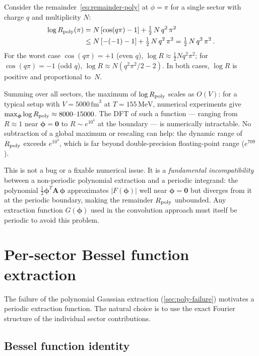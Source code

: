 \documentclass[11pt,a4paper]{article}
\newcommand{\fm}{\,\text{fm}}
\newcommand{\MeV}{\,\text{MeV}}
\newcommand{\bphi}{\bm{\phi}}
\newcommand{\bA}{\bm{A}}
\begin{document}
Consider the remainder~\cref{eq:remainder-poly} at $\phi = \pi$ for a single sector with charge $q$ and multiplicity $N$:
\begin{align}\label{eq:remainder-bound}
  \log R_{\rm poly}(\pi) &= N\,[\cos(q\pi) - 1] + \tfrac{1}{2}\,N\,q^2\,\pi^2 \nonumber\\
  &\leq N\,[-(-1) - 1] + \tfrac{1}{2}\,N\,q^2\,\pi^2 = \tfrac{1}{2}\,N\,q^2\,\pi^2\,.
\end{align}
For the worst case $\cos(q\pi) = +1$ (even $q$), $\log R \approx \frac{1}{2} N q^2 \pi^2$; for $\cos(q\pi) = -1$ (odd $q$), $\log R \approx N(q^2 \pi^2/2 - 2)$.
In both cases, $\log R$ is positive and proportional to~$N$.

Summing over all sectors, the maximum of $\log R_{\rm poly}$ scales as $O(V)$:
for a typical setup with $V = 5000\fm^3$ at $T = 155\MeV$, numerical experiments give $\max_{\bphi} \log R_{\rm poly} \approx 8000\text{--}15000$.
The DFT of such a function --- ranging from $R \approx 1$ near $\bphi = \bm{0}$ to $R \sim e^{10^4}$ at the boundary --- is numerically intractable.
No subtraction of a global maximum or rescaling can help: the dynamic range of $R_{\rm poly}$ exceeds $e^{10^4}$, which is far beyond double-precision floating-point range ($e^{709}$).

This is not a bug or a fixable numerical issue.
It is a \emph{fundamental incompatibility} between a non-periodic polynomial extraction and a periodic integrand: the polynomial $\frac{1}{2}\bphi^T \bA\,\bphi$ approximates $|F(\bphi)|$ well near $\bphi = \bm{0}$ but diverges from it at the periodic boundary, making the remainder $R_{\rm poly}$ unbounded.
Any extraction function $G(\bphi)$ used in the convolution approach must itself be periodic to avoid this problem.


\section{Per-sector Bessel function extraction}
\label{sec:bessel-extraction}

The failure of the polynomial Gaussian extraction (\cref{sec:poly-failure}) motivates a periodic extraction function.
The natural choice is to use the exact Fourier structure of the individual sector contributions.

\subsection{Bessel function identity}
\label{sec:bessel-identity}
\end{document}
